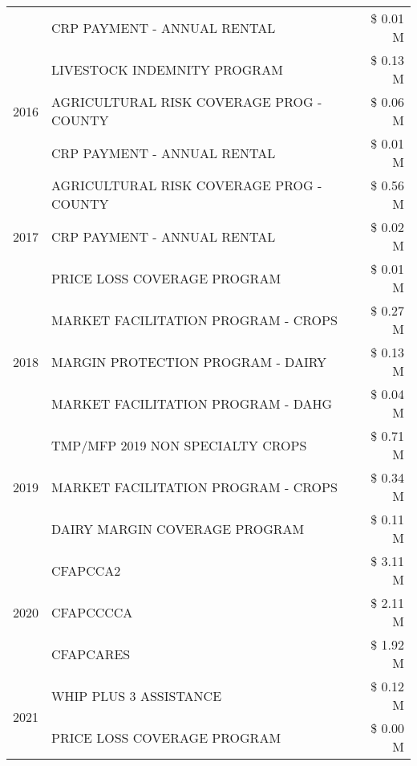 \begin{tabular}{llr}
 & CRP PAYMENT - ANNUAL RENTAL & \$ 0.01 M \\
\cline{1-3}
\multirow[t]{3}{*}{2016} & LIVESTOCK INDEMNITY PROGRAM & \$ 0.13 M \\
 & AGRICULTURAL RISK COVERAGE PROG - COUNTY & \$ 0.06 M \\
 & CRP PAYMENT - ANNUAL RENTAL & \$ 0.01 M \\
\cline{1-3}
\multirow[t]{3}{*}{2017} & AGRICULTURAL RISK COVERAGE PROG - COUNTY & \$ 0.56 M \\
 & CRP PAYMENT - ANNUAL RENTAL & \$ 0.02 M \\
 & PRICE LOSS COVERAGE PROGRAM & \$ 0.01 M \\
\cline{1-3}
\multirow[t]{3}{*}{2018} & MARKET FACILITATION PROGRAM - CROPS & \$ 0.27 M \\
 & MARGIN PROTECTION PROGRAM - DAIRY & \$ 0.13 M \\
 & MARKET FACILITATION PROGRAM - DAHG & \$ 0.04 M \\
\cline{1-3}
\multirow[t]{3}{*}{2019} & TMP/MFP 2019 NON SPECIALTY CROPS & \$ 0.71 M \\
 & MARKET FACILITATION PROGRAM - CROPS & \$ 0.34 M \\
 & DAIRY MARGIN COVERAGE PROGRAM & \$ 0.11 M \\
\cline{1-3}
\multirow[t]{3}{*}{2020} & CFAPCCA2 & \$ 3.11 M \\
 & CFAPCCCCA & \$ 2.11 M \\
 & CFAPCARES & \$ 1.92 M \\
\cline{1-3}
\multirow[t]{2}{*}{2021} & WHIP PLUS 3 ASSISTANCE & \$ 0.12 M \\
 & PRICE LOSS COVERAGE PROGRAM & \$ 0.00 M \\
\cline{1-3}
\bottomrule
\end{tabular}
